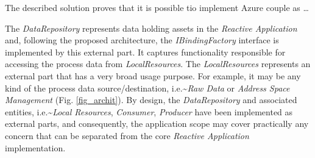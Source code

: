 \documentclass[
]{article}
\begin{document}
The described solution proves that it is possible tio implement Azure
couple as \ldots{}

The \emph{DataRepository} represents data holding assets in the
\emph{Reactive Application} and, following the proposed architecture,
the \emph{IBindingFactory} interface is implemented by this external
part. It captures functionality responsible for accessing the process
data from \emph{LocalResources}. The \emph{LocalResources} represents an
external part that has a very broad usage purpose. For example, it may
be any kind of the process data source/destination,
i.e.\textasciitilde{}\emph{Raw Data} or \emph{Address Space Management}
(Fig. \ref*{fig_archit}). By design, the \emph{DataRepository} and
associated entities, i.e.\textasciitilde{}\emph{Local Resources},
\emph{Consumer}, \emph{Producer} have been implemented as external
parts, and consequently, the application scope may cover practically any
concern that can be separated from the core \emph{Reactive Application}
implementation.
\end{document}
